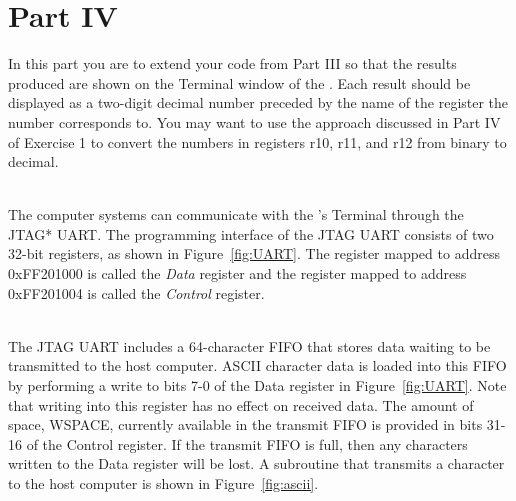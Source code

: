 \documentclass[epsfig,10pt,fullpage]{article}
\begin{document}
\section*{Part IV}
In this part you are to extend your code from Part III so that the results produced are
shown on the Terminal window of the \productNameMedTM{}.
Each result should be displayed as a two-digit decimal number preceded by the name of the register
the number corresponds to. You may want to use the approach discussed in Part IV of Exercise 1 to
convert the numbers in registers r10, r11, and r12 from binary to decimal.  

~\\
The computer systems can communicate with the \productNameMed{}'s Terminal through the 
JTAG* UART.  The programming interface of the JTAG UART consists of two 32-bit registers, as
shown in Figure~\ref{fig:UART}. The register mapped to address 0xFF201000 is called the 
{\it Data} register and the register mapped to address 0xFF201004 is called the {\it
Control} register.

~\\
The JTAG UART includes a 64-character FIFO that stores data waiting to be transmitted to the 
host computer.  ASCII character data is loaded into this FIFO by performing a write to 
bits 7-0 of the Data register in Figure~\ref{fig:UART}. Note that writing into this register 
has no effect on received data. The amount of space, WSPACE, currently available in
the transmit FIFO is provided in bits 31-16 of the Control register. If the transmit FIFO 
is full, then any characters written to the Data register will be lost. A subroutine that 
transmits a character to the host computer is shown in Figure~\ref{fig:ascii}.
\end{document}
